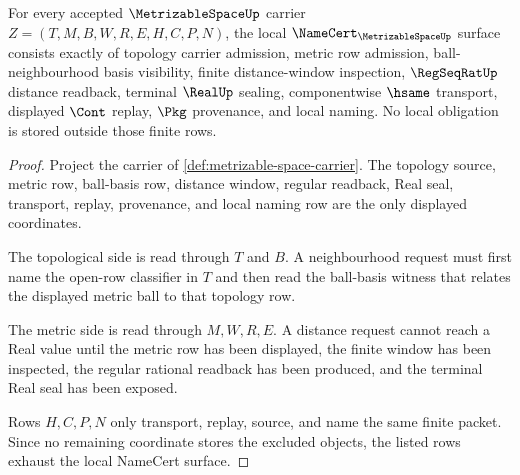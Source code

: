 \begin{theorem}
\label{thm:metrizable-space-namecert-obligations}
For every accepted $\MetrizableSpaceUp$ carrier $Z=(T,M,B,W,R,E,H,C,P,N)$, the local $\NameCert_{\MetrizableSpaceUp}$ surface consists exactly of topology carrier admission, metric row admission, ball-neighbourhood basis visibility, finite distance-window inspection, $\RegSeqRatUp$ distance readback, terminal $\RealUp$ sealing, componentwise $\hsame$ transport, displayed $\Cont$ replay, $\Pkg$ provenance, and local naming. No local obligation is stored outside those finite rows.
\end{theorem}
\begin{proof}
Project the carrier of \autoref{def:metrizable-space-carrier}. The topology source, metric row, ball-basis row, distance window, regular readback, Real seal, transport, replay, provenance, and local naming row are the only displayed coordinates.

The topological side is read through $T$ and $B$. A neighbourhood request must first name the open-row classifier in $T$ and then read the ball-basis witness that relates the displayed metric ball to that topology row.

The metric side is read through $M,W,R,E$. A distance request cannot reach a Real value until the metric row has been displayed, the finite window has been inspected, the regular rational readback has been produced, and the terminal Real seal has been exposed.

Rows $H,C,P,N$ only transport, replay, source, and name the same finite packet. Since no remaining coordinate stores the excluded objects, the listed rows exhaust the local NameCert surface.
\end{proof}

